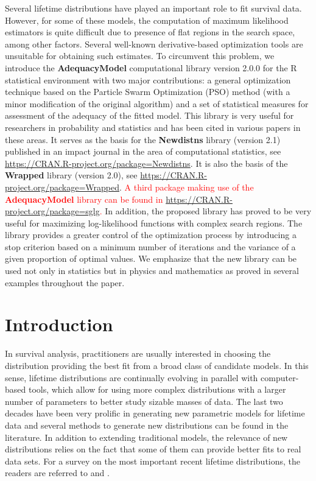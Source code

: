 \documentclass[10pt,letterpaper]{article}
\begin{document}
Several lifetime distributions have  played an important role to fit survival data.
However, for some of these models,  the computation of maximum likelihood estimators is quite difficult due to presence of flat regions in the search space, among other factors.
Several well-known derivative-based optimization tools are unsuitable for obtaining such estimates.
To circumvent this problem, we introduce the \textbf{AdequacyModel} computational library version 2.0.0 for the \textsc{R} statistical environment
with two major contributions: a general optimization technique based on the Particle Swarm Optimization (PSO) method (with a minor modification of the original algorithm)
and a set of statistical measures for assessment of the adequacy of the fitted model.
This library is very useful for researchers in pro\-bability and statistics and has been cited in various papers in these areas.
It serves as the basis for the \textbf{Newdistns} library (version 2.1) published in an impact journal in the area of computational statistics,
see \url{https://CRAN.R-project.org/package=Newdistns}.
It is also the basis of the \textbf{Wrapped} library (version 2.0), see \url{https://CRAN.R-project.org/package=Wrapped}.
\textcolor{red}{A third package  making use of the \textbf{AdequacyModel} library can be found in \url{https://CRAN.R-project.org/package=sglg}.}
In addition, the proposed library has proved to be very useful for maximizing log-likelihood functions with complex search regions.
The library provides a greater control of the optimization process by introducing a stop criterion  based on a minimum number of iterations and the variance of a given proportion of optimal values.
We emphasize that the new library can be used not only in statistics but in physics and mathematics as proved in several examples throughout the paper.

\linenumbers

\section{Introduction}

In survival analysis, practitioners are usually interested in choosing the distribution  providing the best fit from a broad class of candidate models.
In this sense, lifetime distributions are continually evolving in parallel with computer-based tools, which allow for using more complex distributions
with a larger number of parameters to better study sizable masses of data.
The last two decades have been very prolific in generating new parametric models for lifetime data and several methods to generate new distributions can be found in the literature.
In addition to extending traditional models, the relevance of new distributions relies on the fact that some of them can provide better fits to real data sets.
For a survey on the most important recent lifetime distributions, the readers are referred to \cite{almalkinadarajah2014} and \cite{tahircordeiro2016}.
\end{document}
